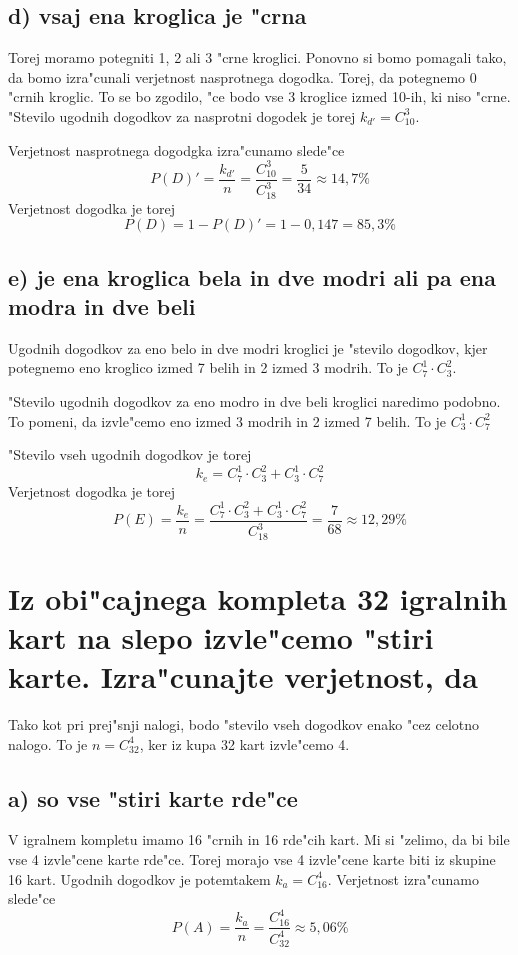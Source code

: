 \documentclass[a4paper, 12pt]{article}
\begin{document}
\subsection*{d) vsaj ena kroglica je "crna}
Torej moramo potegniti 1, 2 ali 3 "crne kroglici. Ponovno si bomo pomagali tako, da bomo izra"cunali verjetnost nasprotnega dogodka. Torej, da potegnemo 0 "crnih kroglic. To se bo zgodilo, "ce bodo vse 3 kroglice izmed 10-ih, ki niso "crne. "Stevilo ugodnih dogodkov za nasprotni dogodek je torej $k_{d'} = C_{10}^3$.

Verjetnost nasprotnega dogodgka izra"cunamo slede"ce
\begin{equation*}
P(D)' = \dfrac{k_{d'}}{n} = \dfrac{C_{10}^3}{C_{18}^3} = \dfrac{5}{34} \approx 14,7\%
\end{equation*}
Verjetnost dogodka je torej
\begin{equation*}
P(D) = 1-P(D)' = 1 - 0,147 = 85,3\%
\end{equation*}

\subsection*{e) je ena kroglica bela in dve modri ali pa ena modra in dve beli}
Ugodnih dogodkov za eno belo in dve modri kroglici je "stevilo dogodkov, kjer potegnemo eno kroglico izmed 7 belih in 2 izmed 3 modrih. To je $C_7^1 \cdot C_3^2$.

"Stevilo ugodnih dogodkov za eno modro in dve beli kroglici naredimo podobno. To pomeni, da izvle"cemo eno izmed 3 modrih in 2 izmed 7 belih. To je $C_3^1 \cdot C_7^2$

"Stevilo vseh ugodnih dogodkov je torej
\begin{equation*}
k_e = C_7^1 \cdot C_3^2 + C_3^1 \cdot C_7^2
\end{equation*}
Verjetnost dogodka je torej
\begin{equation*}
P(E) = \dfrac{k_e}{n} = \dfrac{C_7^1 \cdot C_3^2 + C_3^1 \cdot C_7^2}{C_{18}^3} = \dfrac{7}{68} \approx 12,29\%
\end{equation*}

\section*{Iz obi"cajnega kompleta 32 igralnih kart na slepo izvle"cemo "stiri karte. Izra"cunajte verjetnost, da}
Tako kot pri prej"snji nalogi, bodo "stevilo vseh dogodkov enako "cez celotno nalogo. To je $n = C_{32}^4$, ker iz kupa 32 kart izvle"cemo 4.
\subsection*{a) so vse "stiri karte rde"ce}
V igralnem kompletu imamo 16 "crnih in 16 rde"cih kart. Mi si "zelimo, da bi bile vse 4 izvle"cene karte rde"ce. Torej morajo vse 4 izvle"cene karte biti iz skupine 16 kart. Ugodnih dogodkov je potemtakem $k_a = C_{16}^4$. Verjetnost izra"cunamo slede"ce
\begin{equation*}
P(A) = \dfrac{k_a}{n} = \dfrac{ C_{16}^4}{C_{32}^4} \approx 5,06\%
\end{equation*}
\end{document}
